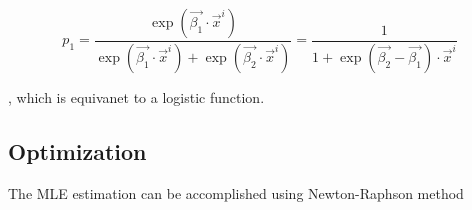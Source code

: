 \documentclass[12pt, oneside]{article}
\begin{document}
\begin{equation}
p_1=\frac{\exp{(\vec{\beta_1}\cdot\vec{x}^i)}}{\exp{(\vec{\beta_1}\cdot\vec{x}^i)}+\exp{(\vec{\beta_2}\cdot\vec{x}^i)}}=\frac{1}{1+\exp{(\vec{\beta_2}-\vec{\beta_1})\cdot\vec{x}^i}}
\end{equation}

, which is equivanet to a logistic function.

  

\subsection{Optimization}

The MLE estimation can be accomplished using Newton-Raphson method
\end{document}
